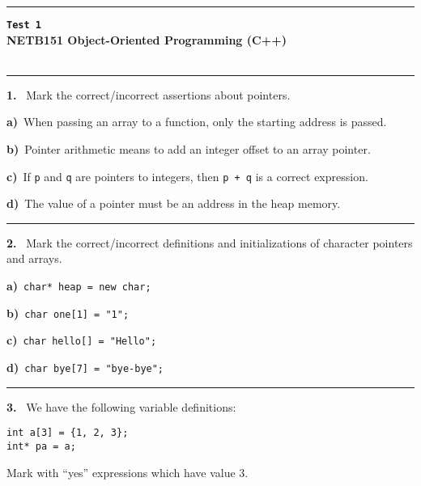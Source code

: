 
\newpage\thispagestyle{empty}\par 
\hrule 
\begin{center}
{\bf\large {}}\hfill {\bf\large\verb|Test 1|}
 \hfill{\bf\large {}}\\ 
{\bf\large NETB151 Object-Oriented Programming (C++)}\\[4pt]
{\bf \large {}}\\ 
\end{center}\par
 \vspace{-4mm}
\begin{multicols}{2}
\par\smallskip\hrule\par\medskip

{\bf 1. }\ Mark the correct/incorrect assertions about pointers.

{\bf a)}\ When passing an array to a function, only the starting address is passed.

{\bf b)}\ Pointer arithmetic means to add an integer offset to an array pointer.

{\bf c)}\ If \verb|p| and \verb|q| are pointers to integers, then \verb|p + q| is a correct expression.

{\bf d)}\ The value of a pointer must be an address in the heap memory.

\par\smallskip\hrule\par\medskip

{\bf 2. }\ Mark the correct/incorrect definitions and initializations 
of character pointers and arrays.

{\bf a)}\ \verb|char* heap = new char;|

{\bf b)}\ \verb|char one[1] = "1";|

{\bf c)}\ \verb|char hello[] = "Hello";|

{\bf d)}\ \verb|char bye[7] = "bye-bye";|

\par\smallskip\hrule\par\medskip

{\bf 3. }\ We have the following variable definitions:
 \vspace{-3mm}\begin{verbatim}
int a[3] = {1, 2, 3};
int* pa = a;
 \end{verbatim}\vspace{-6mm}
Mark with ``yes'' expressions which have value 3.


\end{multicols}
